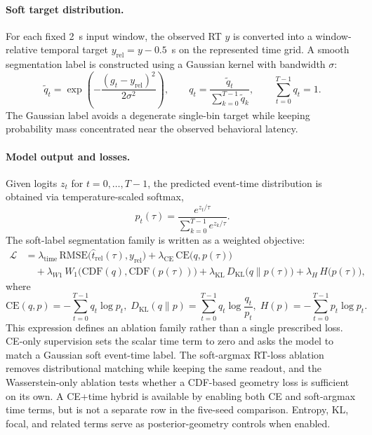 \documentclass[12pt]{article}
\begin{document}
\paragraph{Soft target distribution.}
For each fixed 2~s input window, the observed RT \(y\) is converted into a
window-relative temporal target \(y_{\mathrm{rel}}=y-0.5\)~s on the represented
time grid.
A smooth segmentation label is constructed using a Gaussian kernel with bandwidth $\sigma$:
\begin{equation}
\label{eq:rt_soft_target}
\tilde q_t=\exp\left(-\frac{(g_t-y_{\mathrm{rel}})^2}{2\sigma^2}\right),\qquad
q_t=\frac{\tilde q_t}{\sum_{k=0}^{T-1}\tilde q_k},\qquad
\sum_{t=0}^{T-1} q_t=1.
\end{equation}
The Gaussian label avoids a degenerate single-bin target while keeping probability mass concentrated near the observed behavioral latency.

\paragraph{Model output and losses.}
Given logits $z_t$ for $t=0,\dots,T-1$, the predicted event-time distribution is obtained via temperature-scaled softmax,
\begin{equation}
\label{eq:rt_pred_dist}
p_t(\tau)=\frac{e^{z_t/\tau}}{\sum_{k=0}^{T-1} e^{z_k/\tau}}.
\end{equation}
The soft-label segmentation family is written as a weighted objective:
\begin{equation}
\label{eq:rt_loss}
\begin{aligned}
\mathcal{L}
&= \lambda_{\text{time}}\,\mathrm{RMSE}\big(\hat t_{\mathrm{rel}}(\tau), y_{\mathrm{rel}}\big)
 + \lambda_{\text{CE}}\,\mathrm{CE}\big(q, p(\tau)\big) \\
&\quad + \lambda_{W1}\,W_1\big(\mathrm{CDF}(q), \mathrm{CDF}(p(\tau))\big)
 + \lambda_{\text{KL}}\,D_{\mathrm{KL}}\big(q\|p(\tau)\big)
 + \lambda_{H}\,H\big(p(\tau)\big),
\end{aligned}
\end{equation}
where  
\begin{equation*}
\mathrm{CE}(q,p)=-\sum_{t=0}^{T-1} q_t \log p_t, \;
D_{\mathrm{KL}}(q\|p)=\sum_{t=0}^{T-1} q_t \log\frac{q_t}{p_t}, \;
H(p)=-\sum_{t=0}^{T-1} p_t \log p_t.
\end{equation*}
This expression defines an ablation family rather than a single prescribed loss. CE-only supervision sets the scalar time term to zero and asks the model to match a Gaussian soft event-time label. The soft-argmax RT-loss ablation removes distributional matching while keeping the same readout, and the Wasserstein-only ablation tests whether a CDF-based geometry loss is sufficient on its own. A CE+time hybrid is available by enabling both CE and soft-argmax time terms, but is not a separate row in the five-seed comparison. Entropy, KL, focal, and related terms serve as posterior-geometry controls when enabled.
\end{document}
